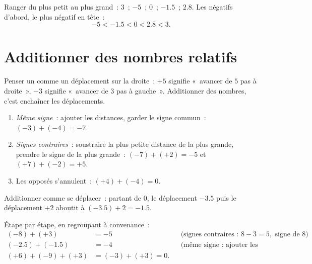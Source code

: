 \begin{example}\label{ex:g7:negatives:compare}
Ranger du plus petit au plus grand~: $3$~; $-5$~; $0$~; $-1.5$~;
$2.8$. Les négatifs d'abord, le plus négatif en tête~:
\[
-5 < -1.5 < 0 < 2.8 < 3 .
\]
\end{example}

\section{Additionner des nombres relatifs}

Penser un  comme un déplacement sur la droite~: $+5$
signifie «~avancer de $5$ pas à droite~», $-3$ signifie «~avancer de
$3$ pas à gauche~». Additionner des nombres, c'est enchaîner les
déplacements.

\begin{method}\label{met:g7:negatives:add}
\begin{enumerate}
  \item \emph{Même signe}~: ajouter les distances, garder le signe
        commun~: $(-3) + (-4) = -7$.
  \item \emph{Signes contraires}~: soustraire la plus petite distance
        de la plus grande, prendre le signe de la plus grande~:
        $(-7) + (+2) = -5$ et $(+7) + (-2) = +5$.
  \item Les opposés s'annulent~: $(+4) + (-4) = 0$.
\end{enumerate}
\end{method}

\begin{omfigure}

{\small Additionner comme se déplacer~: partant de $0$, le
déplacement $-3.5$ puis le déplacement $+2$ aboutit à
$(-3.5) + 2 = -1.5$.}
\end{omfigure}

\begin{example}\label{ex:g7:negatives:add}
Étape par étape, en regroupant à convenance~:
\begin{align*}
(-8) + (+3) &= -5 && \text{(signes contraires~: } 8 - 3 = 5,
\text{ signe de } 8)\\
(-2.5) + (-1.5) &= -4 && \text{(même signe~: ajouter les distances)}\\
(+6) + (-9) + (+3) &= (-3) + (+3) = 0 .
\end{align*}
\end{example}

